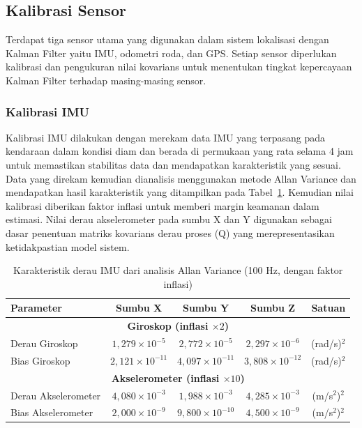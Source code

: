 \subsection{Kalibrasi Sensor}

Terdapat tiga sensor utama yang digunakan dalam sistem lokalisasi dengan Kalman Filter yaitu IMU, odometri roda, dan GPS.
Setiap sensor diperlukan kalibrasi dan pengukuran nilai kovarians untuk menentukan tingkat kepercayaan Kalman Filter terhadap masing-masing sensor.

\subsubsection{Kalibrasi IMU}

Kalibrasi IMU dilakukan dengan merekam data IMU yang terpasang pada kendaraan dalam kondisi diam dan berada di permukaan yang rata selama 4 jam untuk memastikan stabilitas data dan mendapatkan karakteristik yang sesuai.
Data yang direkam kemudian dianalisis menggunakan metode Allan Variance dan mendapatkan hasil karakteristik yang ditampilkan pada Tabel~\ref{tab:allan_variance}.
Kemudian nilai kalibrasi diberikan faktor inflasi untuk memberi margin keamanan dalam estimasi.
Nilai derau akselerometer pada sumbu X dan Y digunakan sebagai dasar penentuan matriks kovarians derau proses (Q) yang merepresentasikan ketidakpastian model sistem.

\begin{table}[H]
\centering
\caption{Karakteristik derau IMU dari analisis Allan Variance (100 Hz, dengan faktor inflasi)}
\label{tab:allan_variance}
\begin{tabular}{l c c c c}
\hline
\textbf{Parameter} & \textbf{Sumbu X} & \textbf{Sumbu Y} & \textbf{Sumbu Z} & \textbf{Satuan} \\
\hline
\multicolumn{5}{c}{\textbf{Giroskop (inflasi $\times2$)}} \\
\hline
Derau Giroskop  & $1{,}279\times10^{-5}$ & $2{,}772\times10^{-5}$ & $2{,}297\times10^{-6}$ & (rad/s)$^2$ \\
Bias Giroskop   & $2{,}121\times10^{-11}$ & $4{,}097\times10^{-11}$ & $3{,}808\times10^{-12}$ & (rad/s)$^2$ \\
\hline
\multicolumn{5}{c}{\textbf{Akselerometer (inflasi $\times10$)}} \\
\hline
Derau Akselerometer     & $4{,}080\times10^{-3}$ & $1{,}988\times10^{-3}$ & $4{,}285\times10^{-3}$ & (m/s$^2$)$^2$ \\
Bias Akselerometer      & $2{,}000\times10^{-9}$ & $9{,}800\times10^{-10}$ & $4{,}500\times10^{-9}$ & (m/s$^2$)$^2$ \\
\hline
\end{tabular}
\end{table}

